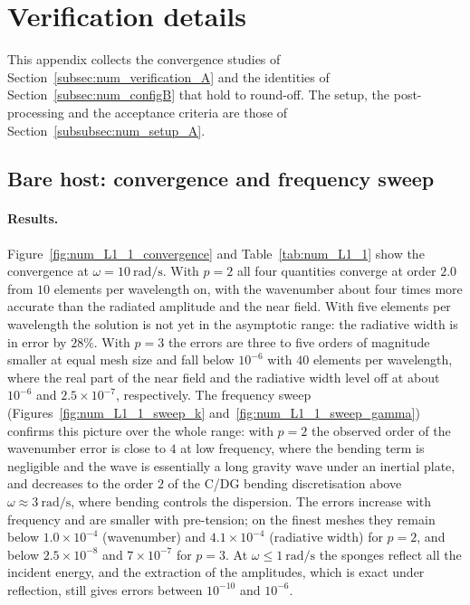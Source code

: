 {\color{red}
\section{Verification details}\label{app:verification}

This appendix collects the convergence studies of Section~\ref{subsec:num_verification_A} and the identities of Section~\ref{subsec:num_configB} that hold to round-off. The setup, the post-processing and the acceptance criteria are those of Section~\ref{subsubsec:num_setup_A}.

\subsection{Bare host: convergence and frequency sweep}\label{app:ver_L1_1}

\paragraph{Results.} Figure~\ref{fig:num_L1_1_convergence} and Table~\ref{tab:num_L1_1} show the convergence at $\omega=10~\si{\radian\per\second}$. With $p=2$ all four quantities converge at order $2.0$ from $10$ elements per wavelength on, with the wavenumber about four times more accurate than the radiated amplitude and the near field. With five elements per wavelength the solution is not yet in the asymptotic range: the radiative width is in error by $28\%$. With $p=3$ the errors are three to five orders of magnitude smaller at equal mesh size and fall below $10^{-6}$ with $40$ elements per wavelength, where the real part of the near field and the radiative width level off at about $10^{-6}$ and $2.5\times10^{-7}$, respectively. The frequency sweep (Figures~\ref{fig:num_L1_1_sweep_k} and~\ref{fig:num_L1_1_sweep_gamma}) confirms this picture over the whole range: with $p=2$ the observed order of the wavenumber error is close to $4$ at low frequency, where the bending term is negligible and the wave is essentially a long gravity wave under an inertial plate, and decreases to the order $2$ of the C/DG bending discretisation above $\omega\approx3~\si{\radian\per\second}$, where bending controls the dispersion. The errors increase with frequency and are smaller with pre-tension; on the finest meshes they remain below $1.0\times10^{-4}$ (wavenumber) and $4.1\times10^{-4}$ (radiative width) for $p=2$, and below $2.5\times10^{-8}$ and $7\times10^{-7}$ for $p=3$. At $\omega\le1~\si{\radian\per\second}$ the sponges reflect all the incident energy, and the extraction of the amplitudes, which is exact under reflection, still gives errors between $10^{-10}$ and $10^{-6}$.

}
